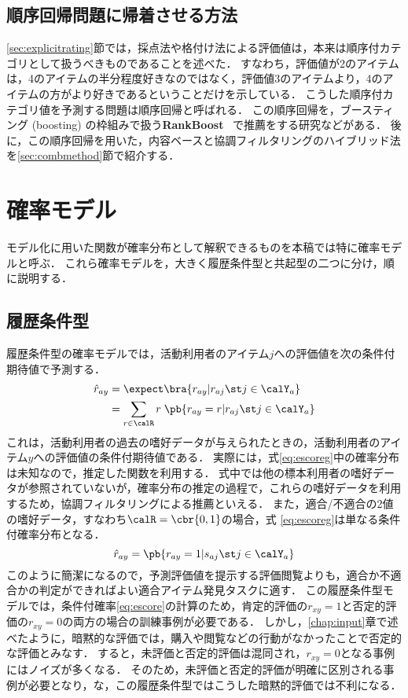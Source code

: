 \subsection{順序回帰問題に帰着させる方法}

\ref{sec:explicitrating}節では，採点法や格付け法による評価値は，本来は順序付カテゴリとして扱うべきものであることを述べた．
すなわち，評価値が2のアイテムは，4のアイテムの半分程度好きなのではなく，評価値3のアイテムより，4のアイテムの方がより好きであるということだけを示している．
こうした順序付カテゴリ値を予測する問題は順序回帰と呼ばれる．
この順序回帰を，ブースティング (boosting) \cite{icml:96:02,jjsai:99:01} の枠組みで扱う\textbf{RankBoost}~\cite{icml:98:03,jmlr:03:02} で推薦をする研究などがある．
後に，この順序回帰を用いた，内容ベースと協調フィルタリングのハイブリッド法を\ref{sec:combmethod}節で紹介する．

\section{確率モデル}
\label{sec:probmodel}

モデル化に用いた関数が確率分布として解釈できるものを本稿では特に確率モデルと呼ぶ．
これら確率モデルを，大きく履歴条件型と共起型の二つに分け，順に説明する．

\subsection{履歴条件型}

履歴条件型の確率モデルでは，活動利用者のアイテム$j$への評価値を次の条件付期待値で予測する\cite{uai:98:01}．
\begin{align}
\hat{r}_{ay} & = \expect\bra{r_{ay}|r_{aj}\st j\in\calY_a}\nonumber\\
& = \sum_{r\in\calR} r\;\pb{r_{ay}=r|r_{aj}\st j\in\calY_a}
\label{eq:escoreg}
\end{align}
これは，活動利用者の過去の嗜好データが与えられたときの，活動利用者のアイテム$y$への評価値の条件付期待値である．
実際には，式\eqref{eq:escoreg}中の確率分布は未知なので，推定した関数を利用する．
式中では他の標本利用者の嗜好データが参照されていないが，確率分布の推定の過程で，これらの嗜好データを利用するため，協調フィルタリングによる推薦といえる．
また，適合/不適合の2値の嗜好データ，すなわち$\calR=\cbr{0,1}$の場合，式
\eqref{eq:escoreg}は単なる条件付確率分布となる．
\begin{equation}
\hat{r}_{ay}=\pb{r_{ay}=1|s_{aj}\st j\in \calY_a}
\label{eq:escore}
\end{equation}
このように簡潔になるので，予測評価値を提示する評価閲覧よりも，適合か不適合かの判定ができればよい適合アイテム発見タスクに適す．
この履歴条件型モデルでは，条件付確率\eqref{eq:escore}の計算のため，肯定的評価の$r_{xy}=1$と否定的評価の$r_{xy}=0$の両方の場合の訓練事例が必要である．
しかし，\ref{chap:input}章で述べたように，暗黙的な評価では，購入や閲覧などの行動がなかったことで否定的な評価とみなす．
すると，未評価と否定的評価は混同され，$r_{xy}=0$となる事例にはノイズが多くなる．
そのため，未評価と否定的評価が明確に区別される事例が必要となり，な，この履歴条件型ではこうした暗黙的評価では不利になる．

